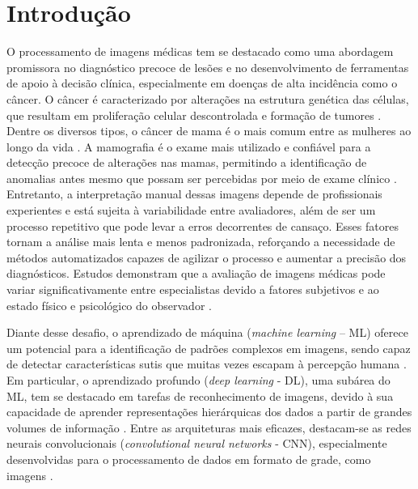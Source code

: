 \documentclass[
	12pt,				%
	openright,			%
	oneside,			%
	a4paper,			%
	tcc,			%
	]{ABNT-DC-UEL}
\begin{document}
\chapter{Introdução}

O processamento de imagens médicas tem se destacado como uma abordagem promissora no diagnóstico precoce de lesões e no desenvolvimento de ferramentas de apoio à decisão clínica, especialmente em doenças de alta incidência como o câncer. O câncer é caracterizado por alterações na estrutura genética das células, que resultam em proliferação celular descontrolada e formação de tumores \cite{feng2018breast}. Dentre os diversos tipos, o câncer de mama é o mais comum entre as mulheres ao longo da vida \cite{precoce2004controle}. A mamografia é o exame mais utilizado e confiável para a detecção precoce de alterações nas mamas, permitindo a identificação de anomalias antes mesmo que possam ser percebidas por meio de exame clínico \cite{azevedo2016importancia}. Entretanto, a interpretação manual dessas imagens depende de profissionais experientes e está sujeita à variabilidade entre avaliadores, além de ser um processo repetitivo que pode levar a erros decorrentes de cansaço. Esses fatores tornam a análise mais lenta e menos padronizada, reforçando a necessidade de métodos automatizados capazes de agilizar o processo e aumentar a precisão dos diagnósticos. Estudos demonstram que a avaliação de imagens médicas pode variar significativamente entre especialistas devido a fatores subjetivos e ao estado físico e psicológico do observador \cite{obuchowicz2020interobserver}.

Diante desse desafio, o aprendizado de máquina (\textit{machine learning} – ML) oferece um potencial para a identificação de padrões complexos em imagens, sendo capaz de detectar características sutis que muitas vezes escapam à percepção humana \cite{erickson2017machine}. Em particular, o aprendizado profundo (\textit{deep learning} - DL), uma subárea do ML, tem se destacado em tarefas de reconhecimento de imagens, devido à sua capacidade de aprender representações hierárquicas dos dados a partir de grandes volumes de informação \cite{lecun2015deep}. Entre as arquiteturas mais eficazes, destacam-se as redes neurais convolucionais (\textit{convolutional neural networks} - CNN), especialmente desenvolvidas para o processamento de dados em formato de grade, como imagens \cite{mendel2019transfer}.
\end{document}

